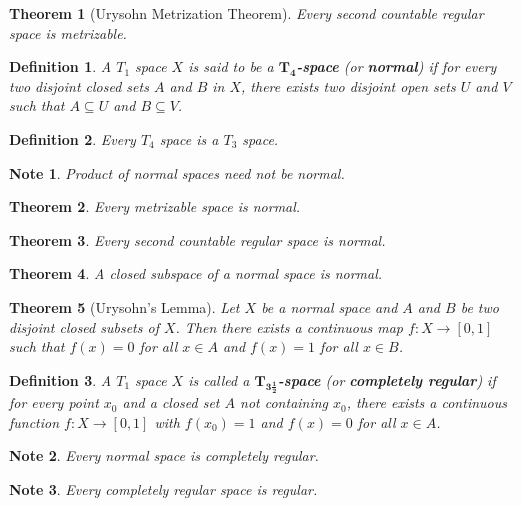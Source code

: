 \documentclass[14pt,twoside]{extreport}
\theoremstyle{dotless}
\newtheorem*{defn}{Definition}
\newtheorem*{thm}{Theorem} %
\newtheorem*{note}{Note} %
\begin{document}
\begin{thm}[Urysohn Metrization Theorem]
    Every second countable regular space is metrizable.
\end{thm}

\begin{defn}
    A $T_1$ space $X$ is said to be a \textbf{$\bm{T_4}$-space} (or \textbf{normal}) if for every two disjoint closed sets $A$ and $B$ in $X$, there exists two disjoint open sets $U$ and $V$ such that $A \subseteq U$ and $B \subseteq V$.
\end{defn}

\begin{defn}
    Every $T_4$ space is a $T_3$ space.
\end{defn}

\begin{note}
    Product of normal spaces need not be normal.
\end{note}

\begin{thm}
    Every metrizable space is normal.
\end{thm}

\begin{thm}
    Every second countable regular space is normal.
\end{thm}

\begin{thm}
    A closed subspace of a normal space is normal.
\end{thm}

\begin{thm}[Urysohn's Lemma]
    Let $X$ be a normal space and $A$ and $B$ be two disjoint closed subsets of $X$. Then there exists a continuous map $f: X \to [0,1]$ such that $f(x) = 0$ for all $x \in A$ and $f(x) = 1$ for all $x \in B$.
\end{thm}

\begin{defn}
    A $T_1$ space $X$ is called a \textbf{$\bm{T_{3 \frac{1}{2}}}$-space} (or \textbf{completely regular}) if for every point $x_0$ and a closed set $A$ not containing $x_0$, there exists a continuous function $f: X \to [0,1]$ with $f(x_0) = 1$ and $f(x) = 0$ for all $x \in A$.
\end{defn}

\begin{note}
    Every normal space is completely regular.
\end{note}

\begin{note}
    Every completely regular space is regular.
\end{note}
\end{document}
